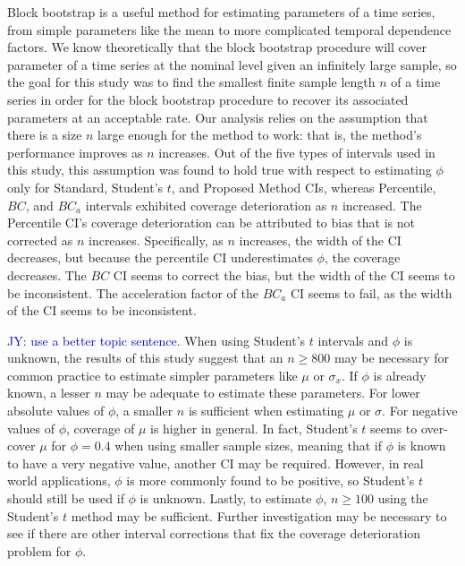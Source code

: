 \documentclass[12pt, letterpaper, titlepage]{article}
\newcommand{\jy}[1]{\textcolor{blue}{JY: #1}}
\begin{document}
Block bootstrap is a useful method for estimating parameters of a time series,
from simple parameters like the mean to more complicated temporal dependence
factors. We know theoretically that the block bootstrap procedure will cover
parameter of a time series at the nominal level given an infinitely large
sample, so the goal for this study was to find the smallest finite sample
length $n$ of a time series in order for the block bootstrap procedure to 
recover its associated parameters at an acceptable rate.
Our analysis relies on the assumption that there is a size $n$ large
enough for the method to work: that is, the method's performance improves as
$n$ increases. Out of the five types of intervals used in this study, this
assumption was found to hold true with respect to estimating $\phi$ only for
Standard, Student's $t$, and Proposed Method CIs, whereas Percentile, $BC$,
and $BC_a$ intervals exhibited coverage deterioration as $n$ increased. The
Percentile CI's coverage deterioration can be attributed to bias that is not
corrected as $n$ increases. Specifically, as $n$ increases, the width of the
CI decreases, but because the percentile CI underestimates $\phi$, the
coverage decreases. The $BC$ CI seems to correct the bias, but the width of
the CI seems to be inconsistent. The acceleration factor of the $BC_a$ CI
seems to fail, as the width of the CI seems to be inconsistent. 


\jy{use a better topic sentence.}
When using Student's $t$ intervals and $\phi$ is unknown, the results of this
study suggest that an $n \geq 800$ may be necessary for common practice to
estimate simpler parameters like $\mu$ or $\sigma_x$. If $\phi$ is already
known, a lesser $n$ may be adequate to estimate these parameters. For lower
absolute values of $\phi$, a smaller $n$ is sufficient when estimating $\mu$
or $\sigma$. For negative values of $\phi$, coverage of $\mu$ is higher in
general. In fact, Student's $t$ seems to over-cover $\mu$ for $\phi = 0.4$
when using smaller sample sizes, meaning that if $\phi$ is known to have a
very negative value, another CI may be required. However, in real world
applications, $\phi$ is more commonly found to be positive, so Student's $t$
should still be used if $\phi$ is unknown. Lastly, to estimate $\phi$,
$n \geq 100$ using the Student's $t$ method may be sufficient. Further
investigation may be necessary to see if there are other interval corrections
that fix the coverage deterioration problem for $\phi$.
\end{document}
